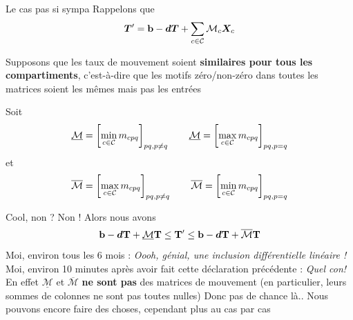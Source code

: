 \documentclass[aspectratio=169]{beamer}\usepackage[]{graphicx}\usepackage[]{xcolor}
\begin{document}
\begin{frame}{Le cas pas si sympa}
Rappelons que
$$
\bm{T}'=\mathbf{b}-\bm{d}\bm{T}+\sum_{c\in\mathcal{C}}\mathcal{M}_c\bm{X}_{c}
$$

Supposons que les taux de mouvement soient \textbf{similaires pour tous les compartiments}, c'est-à-dire que les motifs zéro/non-zéro dans toutes les matrices soient les mêmes mais pas les entrées

Soit
$$
\underline{\mathcal{M}}=\left[\min_{c\in\mathcal{C}}m_{cpq}\right]_{pq,p\neq q}\qquad 
\underline{\mathcal{M}}=\left[\max_{c\in\mathcal{C}}m_{cpq}\right]_{pq,p=q}
$$
et
$$
\overline{\mathcal{M}}=\left[\max_{c\in\mathcal{C}}m_{cpq}\right]_{pq,p\neq q}\qquad
\overline{\mathcal{M}}=\left[\min_{c\in\mathcal{C}}m_{cpq}\right]_{pq,p=q}
$$
\end{frame}


\begin{frame}{Cool, non ? Non !}
Alors nous avons
$$
\mathbf{b}-\bm{d}\mathbf{T}+\underline{\mathcal{M}}\mathbf{T}\leq\mathbf{T}'\leq\mathbf{b}-\bm{d}\mathbf{T}+\overline{\mathcal{M}}\mathbf{T}
$$
\vfill
Moi, environ tous les 6 mois : \emph{Oooh, génial, une inclusion différentielle linéaire !}
\vfill
Moi, environ 10 minutes après avoir fait cette déclaration précédente : \emph{Quel con!} 
\vfill
En effet $\underline{\mathcal{M}}$ et $\overline{\mathcal{M}}$ \textbf{ne sont pas} des matrices de mouvement (en particulier, leurs sommes de colonnes ne sont pas toutes nulles)
\vfill
Donc pas de chance là.. 
\vfill
Nous pouvons encore faire des choses, cependant plus au cas par cas
\end{frame}



\end{document}
